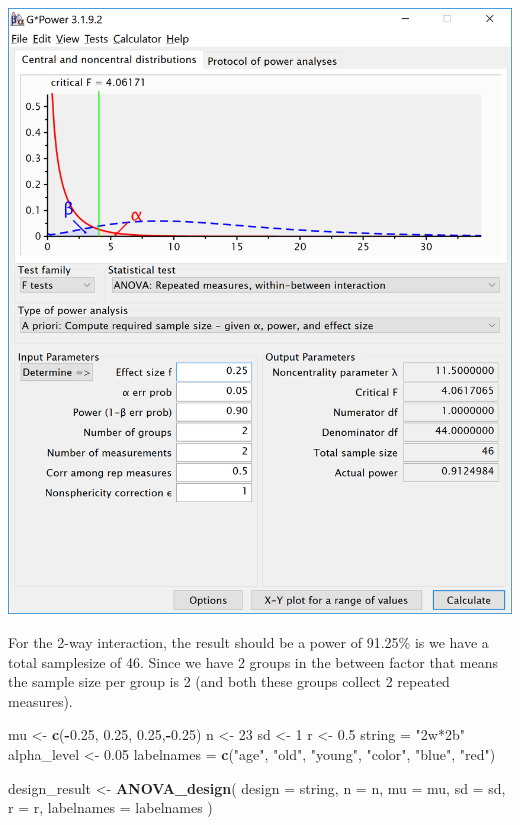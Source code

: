 \documentclass[]{book}
\newenvironment{Shaded}{\begin{snugshade}}{\end{snugshade}}
\newcommand{\DataTypeTok}[1]{\textcolor[rgb]{0.13,0.29,0.53}{#1}}
\newcommand{\DecValTok}[1]{\textcolor[rgb]{0.00,0.00,0.81}{#1}}
\newcommand{\FloatTok}[1]{\textcolor[rgb]{0.00,0.00,0.81}{#1}}
\newcommand{\KeywordTok}[1]{\textcolor[rgb]{0.13,0.29,0.53}{\textbf{#1}}}
\newcommand{\NormalTok}[1]{#1}
\newcommand{\OperatorTok}[1]{\textcolor[rgb]{0.81,0.36,0.00}{\textbf{#1}}}
\newcommand{\StringTok}[1]{\textcolor[rgb]{0.31,0.60,0.02}{#1}}
\begin{document}
\includegraphics{screenshots/gpower_5.png}

For the 2-way interaction, the result should be a power of 91.25\% is we have a total samplesize of 46. Since we have 2 groups in the between factor that means the sample size per group is 2 (and both these groups collect 2 repeated measures).

\begin{Shaded}
\begin{Highlighting}[]
\NormalTok{mu <-}\StringTok{ }\KeywordTok{c}\NormalTok{(}\OperatorTok{-}\FloatTok{0.25}\NormalTok{, }\FloatTok{0.25}\NormalTok{, }\FloatTok{0.25}\NormalTok{,}\OperatorTok{-}\FloatTok{0.25}\NormalTok{)}
\NormalTok{n <-}\StringTok{ }\DecValTok{23}
\NormalTok{sd <-}\StringTok{ }\DecValTok{1}
\NormalTok{r <-}\StringTok{ }\FloatTok{0.5}
\NormalTok{string =}\StringTok{ "2w*2b"}
\NormalTok{alpha_level <-}\StringTok{ }\FloatTok{0.05}
\NormalTok{labelnames =}\StringTok{ }\KeywordTok{c}\NormalTok{(}\StringTok{"age"}\NormalTok{, }\StringTok{"old"}\NormalTok{, }\StringTok{"young"}\NormalTok{, }\StringTok{"color"}\NormalTok{, }\StringTok{"blue"}\NormalTok{, }\StringTok{"red"}\NormalTok{)}

\NormalTok{design_result <-}\StringTok{ }\KeywordTok{ANOVA_design}\NormalTok{(}
\DataTypeTok{design =}\NormalTok{ string,}
\DataTypeTok{n =}\NormalTok{ n,}
\DataTypeTok{mu =}\NormalTok{ mu,}
\DataTypeTok{sd =}\NormalTok{ sd,}
\DataTypeTok{r =}\NormalTok{ r,}
\DataTypeTok{labelnames =}\NormalTok{ labelnames}
\NormalTok{)}
\end{Highlighting}
\end{Shaded}
\end{document}
